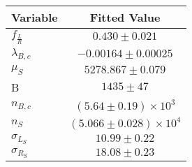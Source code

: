 \begin{tabular}[t]{lc}
\hline
Variable &Fitted Value\\
\hline\hline
$f_{\frac{L}{R}}$&$0.430\pm0.021$\\
\hline
$\lambda_{B,c}$&$-0.00164\pm0.00025$\\
\hline
$\mu_S$&$5278.867\pm0.079$\\
\hline
B&$1435\pm47$\\
\hline
$n_{B,c}$&$(5.64\pm0.19)\times 10^3$\\
\hline
$n_S$&$(5.066\pm0.028)\times 10^4$\\
\hline
$\sigma_{L_S}$&$10.99\pm0.22$\\
\hline
$\sigma_{R_S}$&$18.08\pm0.23$\\
\hline
\end{tabular}
